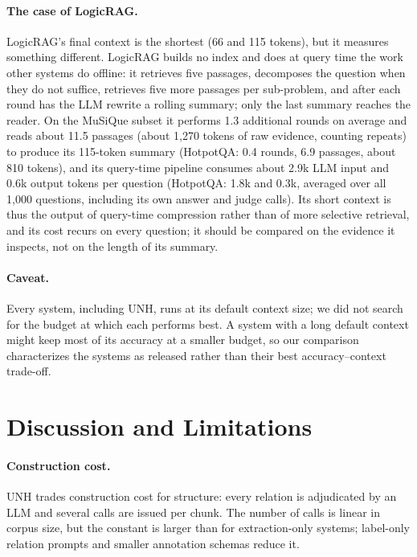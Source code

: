 \documentclass[sigconf, review, anonymous]{acmart}
\newcommand{\sys}{UNH}
\begin{document}
\paragraph{The case of LogicRAG.}
LogicRAG's final context is the shortest (66 and 115 tokens), but it measures something different. LogicRAG builds no index and does at query time the work other systems do offline: it retrieves five passages, decomposes the question when they do not suffice, retrieves five more passages per sub-problem, and after each round has the LLM rewrite a rolling summary; only the last summary reaches the reader. On the MuSiQue subset it performs 1.3 additional rounds on average and reads about 11.5 passages (about 1{,}270 tokens of raw evidence, counting repeats) to produce its 115-token summary (HotpotQA: 0.4 rounds, 6.9 passages, about 810 tokens), and its query-time pipeline consumes about 2.9k LLM input and 0.6k output tokens per question (HotpotQA: 1.8k and 0.3k, averaged over all 1{,}000 questions, including its own answer and judge calls). Its short context is thus the output of query-time compression rather than of more selective retrieval, and its cost recurs on every question; it should be compared on the evidence it inspects, not on the length of its summary.

\paragraph{Caveat.}
Every system, including \sys{}, runs at its default context size; we did not search for the budget at which each performs best. A system with a long default context might keep most of its accuracy at a smaller budget, so our comparison characterizes the systems as released rather than their best accuracy--context trade-off.

\section{Discussion and Limitations}
\label{sec:limitations}

\paragraph{Construction cost.}
\sys{} trades construction cost for structure: every relation is adjudicated by an LLM and several calls are issued per chunk. The number of calls is linear in corpus size, but the constant is larger than for extraction-only systems; label-only relation prompts and smaller annotation schemas reduce it.
\end{document}
